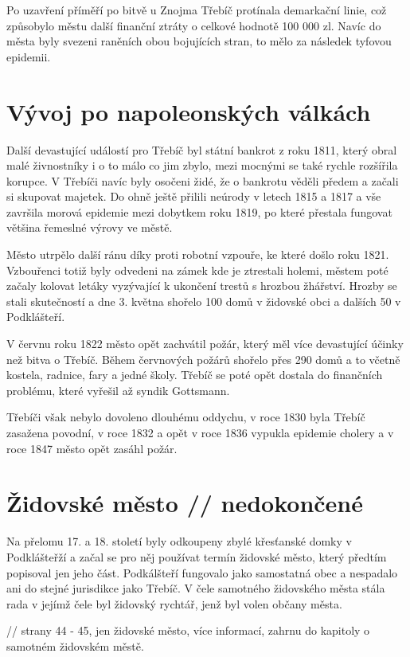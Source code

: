 \documentclass[a4paper,oneside,12p]{report}
\begin{document}
Po uzavření příměří po bitvě u Znojma Třebíč protínala demarkační linie, což způsobylo městu další finanční ztráty o celkové hodnotě 100 000 zl.
Navíc do města byly svezeni raněních obou bojujících stran, to mělo za následek tyfovou epidemii. %

\section{Vývoj po napoleonských válkách}

Další devastující událostí pro Třebíč byl státní bankrot z roku 1811, který obral malé živnostníky i o to málo co jim zbylo, mezi mocnými se také rychle rozšířila korupce.
V Třebíči navíc byly osočeni židé, že o bankrotu věděli předem a začali si skupovat majetek.
Do ohně ještě přilili neúrody v letech 1815 a 1817 a vše završila morová epidemie mezi dobytkem roku 1819, po které přestala fungovat většina řemeslné výrovy ve městě. %

Město utrpělo další ránu díky proti robotní vzpouře, ke které došlo roku 1821.
Vzbouřenci totiž byly odvedeni na zámek kde je ztrestali holemi, městem poté začaly kolovat letáky vyzývající k ukončení trestů s hrozbou žhářství.
Hrozby se stali skutečností a dne 3. května shořelo 100 domů v židovské obci a dalších 50 v Podklášteří. %

V červnu roku 1822 město opět zachvátil požár, který měl více devastující účinky než bitva o Třebíč.
Během červnových požárů shořelo přes 290 domů a to včetně kostela, radnice, fary a jedné školy.
Třebíč se poté opět dostala do finančních problému, které vyřešil až syndik Gottsmann.

Třebíči však nebylo dovoleno dlouhému oddychu, v roce 1830 byla Třebíč zasažena povodní, v roce 1832 a opět v roce 1836 vypukla epidemie cholery a v roce 1847 město opět zasáhl požár.

\section{Židovské město // nedokončené}

Na přelomu 17. a 18. století byly odkoupeny zbylé křesťanské domky v Podklášteřží a začal se pro něj používat termín židovské město, který předtím popisoval jen jeho část.
Podkálšteří fungovalo jako samostatná obec a nespadalo ani do stejné jurisdikce jako Třebíč.
V čele samotného židovského města stála rada v jejímž čele byl židovský rychtář, jenž byl volen občany města.

// strany 44 - 45, jen židovské město, více informací, zahrnu do kapitoly o samotném židovském městě.
\end{document}
